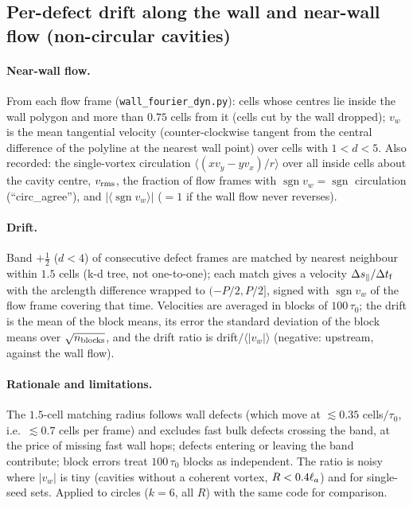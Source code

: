 \subsection{Per-defect drift along the wall and near-wall flow (non-circular cavities)}
\label{sec:md-drift}

\paragraph{Near-wall flow.} From each flow frame (\texttt{wall\_fourier\_dyn.py}): cells whose centres lie inside the wall polygon and more than
$0.75$ cells from it (cells cut by the wall dropped); $v_w$ is the mean tangential velocity (counter-clockwise tangent from the central
difference of the polyline at the nearest wall point) over cells with $1<d<5$. Also recorded: the single-vortex circulation
$\langle(x v_y-y v_x)/r\rangle$ over all inside cells about the cavity centre, $v_{\rm rms}$, the fraction of flow frames with
$\operatorname{sgn}v_w=\operatorname{sgn}$ circulation (``circ\_agree''), and $|\langle\operatorname{sgn}v_w\rangle|$ ($=1$ if the wall flow never reverses).

\paragraph{Drift.} Band $+\tfrac12$ ($d<4$) of consecutive defect frames are matched by nearest neighbour within $1.5$ cells (k-d tree, not
one-to-one); each match gives a velocity $\Delta s_\parallel/\Delta t_{\rm f}$ with the arclength difference wrapped to $(-P/2,P/2]$, signed with
$\operatorname{sgn}v_w$ of the flow frame covering that time. Velocities are averaged in blocks of $100\,\tau_0$; the drift is the mean of
the block means, its error the standard deviation of the block means over $\sqrt{n_{\rm blocks}}$, and the drift ratio is
drift$/\langle|v_w|\rangle$ (negative: upstream, against the wall flow).
\paragraph{Rationale and limitations.} The $1.5$-cell matching radius follows wall defects (which move at $\lesssim0.35$ cells$/\tau_0$, i.e.\
$\lesssim0.7$ cells per frame) and excludes fast bulk defects crossing the band, at the price of missing fast wall hops; defects entering or
leaving the band contribute; block errors treat $100\,\tau_0$ blocks as independent. The ratio is noisy where $|v_w|$ is tiny (cavities without
a coherent vortex, $R<0.4\ell_a$) and for single-seed sets. Applied to circles ($k=6$, all $R$) with the same code for comparison.

